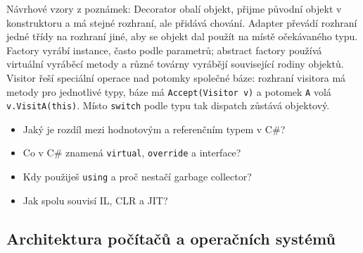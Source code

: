 \begin{odpoved}
Návrhové vzory z poznámek: Decorator obalí objekt, přijme původní objekt v konstruktoru
a má stejné rozhraní, ale přidává chování. Adapter převádí rozhraní jedné třídy na
rozhraní jiné, aby se objekt dal použít na místě očekávaného typu. Factory vyrábí
instance, často podle parametrů; abstract factory používá virtuální vyráběcí metody a
různé továrny vyrábějí související rodiny objektů. Visitor řeší speciální operace nad
potomky společné báze: rozhraní visitora má metody pro jednotlivé typy, báze má
\texttt{Accept(Visitor v)} a potomek \texttt{A} volá \texttt{v.VisitA(this)}. Místo
\texttt{switch} podle typu tak dispatch zůstává objektový.
\end{odpoved}

\begin{recall}
\begin{itemize}[leftmargin=1.2em,itemsep=0pt,topsep=1pt]
  \item Jaký je rozdíl mezi hodnotovým a referenčním typem v C\#?
  \item Co v C\# znamená \texttt{virtual}, \texttt{override} a interface?
  \item Kdy použiješ \texttt{using} a proč nestačí garbage collector?
  \item Jak spolu souvisí IL, CLR a JIT?
\end{itemize}
\end{recall}

\subsection{Architektura počítačů a operačních systémů}

